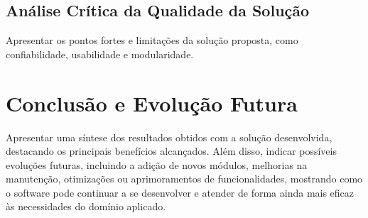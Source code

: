 \documentclass{article}
\begin{document}
\subsection{Análise Crítica da Qualidade da Solução}

Apresentar os pontos fortes e limitações da solução proposta, como confiabilidade, usabilidade e modularidade.

\section{Conclusão e Evolução Futura}
\label{sec:conclusao}

Apresentar uma síntese dos resultados obtidos com a solução desenvolvida, destacando os principais benefícios alcançados. Além disso, indicar possíveis evoluções futuras, incluindo a adição de novos módulos, melhorias na manutenção, otimizações ou aprimoramentos de funcionalidades, mostrando como o software pode continuar a se desenvolver e atender de forma ainda mais eficaz às necessidades do domínio aplicado.

\nocite{*}

  

\end{document}
